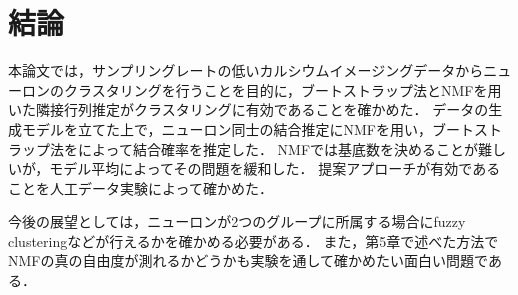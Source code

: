 \chapter{結論}
本論文では，サンプリングレートの低いカルシウムイメージングデータからニューロンのクラスタリングを行うことを目的に，ブートストラップ法とNMFを用いた隣接行列推定がクラスタリングに有効であることを確かめた．
データの生成モデルを立てた上で，ニューロン同士の結合推定にNMFを用い，ブートストラップ法をによって結合確率を推定した．
NMFでは基底数を決めることが難しいが，モデル平均によってその問題を緩和した．
提案アプローチが有効であることを人工データ実験によって確かめた．

今後の展望としては，ニューロンが2つのグループに所属する場合にfuzzy clusteringなどが行えるかを確かめる必要がある．
また，第5章で述べた方法でNMFの真の自由度が測れるかどうかも実験を通して確かめたい面白い問題である．

